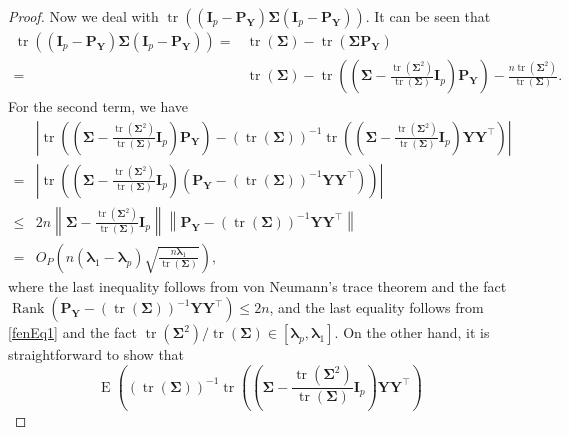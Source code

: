 \documentclass[10pt]{book}
\theoremstyle{definition}
\DeclareMathOperator{\mytr}{tr}
\DeclareMathOperator{\myrank}{Rank}
\DeclareMathOperator{\myE}{E}
\newcommand{\bP}{\mathbf{P}}
\newcommand{\bY}{\mathbf{Y}}
\newcommand{\bI}{\mathbf{I}}
\newcommand{\bfsym}[1]{\ensuremath{\boldsymbol{#1}}}
\def\blambda {\bfsym {\lambda}}
\def\bSigma {\bfsym {\Sigma}}
\begin{document}
\begin{proof}
        Now we deal with $
        \mytr \left( (\bI_p-\bP_{\bY})\bSigma (\bI_p-\bP_{\bY})\right)
        $.
        It can be seen that
        \begin{equation}\label{fenEq2}
        \begin{split}
        \mytr \left( (\bI_p-\bP_{\bY})\bSigma (\bI_p-\bP_{\bY})\right)
        =&
        \mytr \left(\bSigma \right)-
        \mytr \left(\bSigma\bP_{\bY}\right)
        \\
        =&
        \mytr \left(\bSigma \right)-
        \mytr \left(\left(\bSigma - \frac{\mytr(\bSigma^2)}{\mytr(\bSigma)} \bI_p \right)\bP_{\bY}\right)
        -\frac{n\mytr(\bSigma^2)}{\mytr(\bSigma)}
        .
        \end{split}
    \end{equation}
    For the second term, we have
    \begin{equation*}
        \begin{split}
        &\left|
        \mytr \left(\left(\bSigma - \frac{\mytr(\bSigma^2)}{\mytr(\bSigma)} \bI_p \right)\bP_{\bY}\right)
        -
        \left(\mytr(\bSigma)\right)^{-1}\mytr \left(\left(\bSigma - \frac{\mytr(\bSigma^2)}{\mytr(\bSigma)} \bI_p \right)\bY \bY^\top\right)
        \right|
        \\
        =&\left|\mytr \left(\left(\bSigma - \frac{\mytr(\bSigma^2)}{\mytr(\bSigma)} \bI_p \right)\left(\bP_{\bY}- \left(\mytr(\bSigma)\right)^{-1}\bY\bY^\top \right)\right)
        \right|
        \\
        \leq&
2n 
\left\|
\bSigma - \frac{\mytr(\bSigma^2)}{\mytr(\bSigma)} \bI_p
\right\|
\left\|
\bP_{\bY}- \left(\mytr(\bSigma)\right)^{-1}\bY\bY^\top 
\right\|
        \\
        =&
        O_P\left(
            n(\blambda_1-\blambda_p)\sqrt{\frac{n\blambda_1}{\mytr(\bSigma)}}
        \right)
,
        \end{split}
    \end{equation*}
    where the last inequality follows from von Neumann's trace theorem and the fact $\myrank\left( \bP_{\bY}-\left(\mytr(\bSigma)\right)^{-1}\bY\bY^\top \right)\leq 2n$, and the last equality follows from \eqref{fenEq1}
    and the fact $\mytr(\bSigma^2)/\mytr(\bSigma)\in [\blambda_p, \blambda_1]$.
    On the other hand, it is straightforward to show that
    \begin{equation*}
        \myE \left(
        \left(\mytr(\bSigma)\right)^{-1}\mytr \left(\left(\bSigma - \frac{\mytr(\bSigma^2)}{\mytr(\bSigma)} \bI_p \right)\bY \bY^\top\right)

\end{equation*}
\end{proof}
\end{document}
